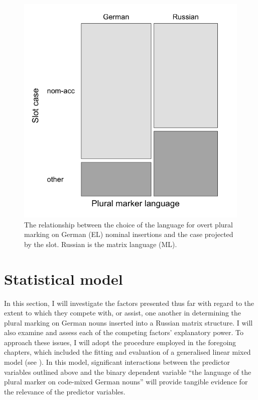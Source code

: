 \begin{figure}
\includegraphics[scale=0.3]{figures/6-Figure_4.png}
\caption{The relationship between the choice of the language for overt plural marking on German (EL) nominal insertions and the case projected by the slot. Russian is the matrix language (ML).\label{fig:6:4}}
\end{figure}

\section{Statistical model}\label{sec:stat}

In this section, I will investigate the factors presented thus far with regard to the extent to which they compete with, or assist, one another in determining the plural marking on German nouns inserted into a Russian matrix structure. I will also examine and assess each of the competing factors’ explanatory power. To approach these issues, I will adopt the procedure employed in the foregoing chapters, which included the fitting and evaluation of a generalised linear mixed model (see \citealt[278--284]{baayen-analyzing}). In this model, significant interactions between the predictor variables outlined above and the binary dependent variable “the language of the plural marker on code-mixed German nouns” will provide tangible evidence for the relevance of the predictor variables.

